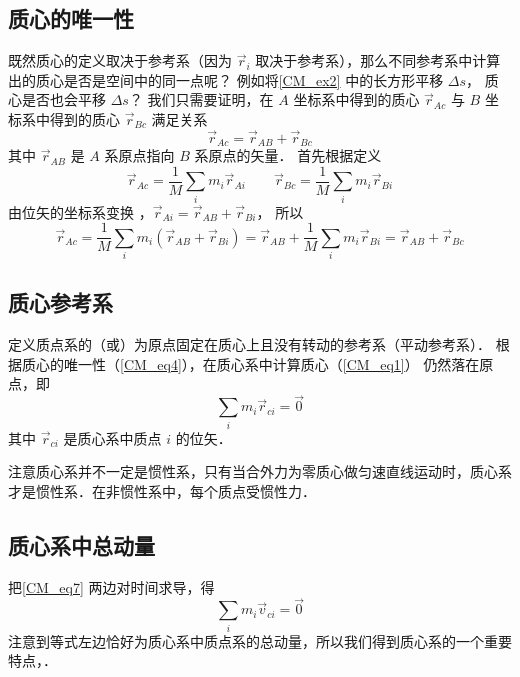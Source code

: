 \subsection{质心的唯一性}
既然质心的定义取决于参考系（因为 $\vec r_i$ 取决于参考系），那么不同参考系中计算出的质心是否是空间中的同一点呢？ 例如将\autoref{CM_ex2} 中的长方形平移 $\Delta s$， 质心是否也会平移 $\Delta s$？ 我们只需要证明，在 $A$ 坐标系中得到的质心 $\vec r_{Ac}$ 与 $B$ 坐标系中得到的质心 $\vec r_{Bc}$ 满足关系
\begin{equation}\label{CM_eq4}
\vec r_{Ac} = \vec r_{AB} + \vec r_{Bc}
\end{equation}
其中 $\vec r_{AB}$ 是 $A$ 系原点指向 $B$ 系原点的矢量． 首先根据定义
\begin{equation}
\vec r_{Ac} = \frac{1}{M}\sum_i m_i \vec r_{Ai}  \qquad \vec r_{Bc} = \frac{1}{M}\sum_i  m_i \vec r_{Bi} 
\end{equation}
由位矢的坐标系变换%
，$\vec r_{Ai} = \vec r_{AB} + \vec r_{Bi}$， 所以
\begin{equation}
\vec r_{Ac} = \frac{1}{M}\sum_i m_i(\vec r_{AB} + \vec r_{Bi})  = \vec r_{AB} + \frac{1}{M} \sum_i m_i \vec r_{Bi}  = \vec r_{AB} + \vec r_{Bc}
\end{equation}
 
\subsection{质心参考系}
定义质点系的（或）为原点固定在质心上且没有转动的参考系（平动参考系）．%
根据质心的唯一性（\autoref{CM_eq4}），在质心系中计算质心（\autoref{CM_eq1}） 仍然落在原点，即
\begin{equation}\label{CM_eq7}
\sum_i m_i \vec r_{ci} = \vec 0
\end{equation}
其中 $\vec r_{ci}$ 是质心系中质点 $i$ 的位矢．

注意质心系并不一定是惯性系，只有当合外力为零质心做匀速直线运动时，质心系才是惯性系．在非惯性系中，每个质点受惯性力．

\subsection{质心系中总动量}
把\autoref{CM_eq7} 两边对时间求导，得
\begin{equation}\label{CM_eq8}
\sum_i m_i \vec v_{ci} = \vec 0
\end{equation}
注意到等式左边恰好为质心系中质点系的总动量，所以我们得到质心系的一个重要特点，．
